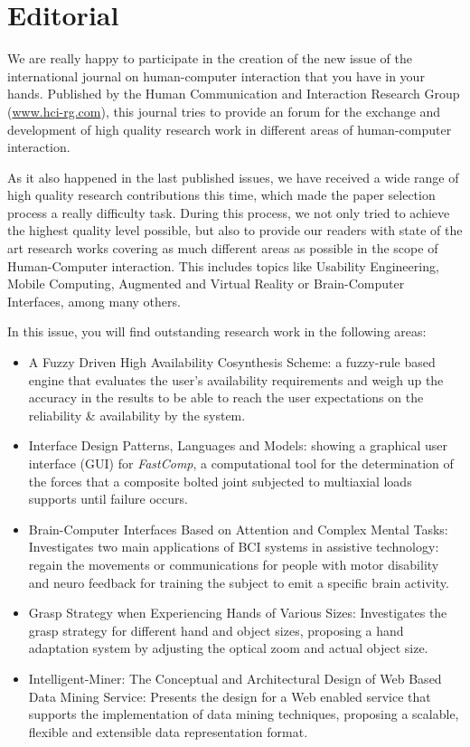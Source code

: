 \chapter*{Editorial}
We are really happy to participate in the creation of the new issue of the international journal on human-computer interaction that you have in your hands. Published by the Human Communication and Interaction Research Group (\url{www.hci-rg.com}), this journal tries to provide an forum for the exchange and development of high quality research work in different areas of human-computer interaction.


As it also happened in the last published issues, we have received a wide range of high quality research contributions this time, which made the paper selection process a really difficulty task. During this process, we not only tried to achieve the highest quality level possible, but also to provide our readers with state of the art research works covering as much different areas as possible in the scope of Human-Computer interaction. This includes topics like Usability Engineering, Mobile Computing, Augmented and Virtual Reality or Brain-Computer Interfaces, among many others.

In this issue, you will find outstanding research work in the following areas:

\begin{itemize}
	\item A Fuzzy Driven High Availability Cosynthesis Scheme:  a fuzzy-rule based engine that evaluates the user's availability requirements and weigh up the accuracy in the results to be able to reach the user expectations on the reliability \& availability by the system.

	\item Interface Design Patterns, Languages and Models: showing a graphical user interface (GUI) for \textit{FastComp}, a computational tool for the determination of the forces that a composite bolted joint subjected to multiaxial loads supports until failure occurs.

	\item Brain-Computer Interfaces Based on Attention and Complex Mental Tasks: Investigates two main applications of BCI systems in assistive technology: regain the movements or communications for people with motor disability and neuro feedback for training the subject to emit a specific brain activity.

	\item Grasp Strategy when Experiencing Hands of Various Sizes: Investigates the grasp strategy for different hand and object sizes, proposing a hand adaptation system by adjusting the optical zoom and actual object size.

	\item Intelligent-Miner: The Conceptual and Architectural Design of Web Based Data Mining Service: Presents the design for a Web enabled service that supports the implementation of data mining techniques, proposing a scalable, flexible and extensible data representation format.

\end{itemize}

